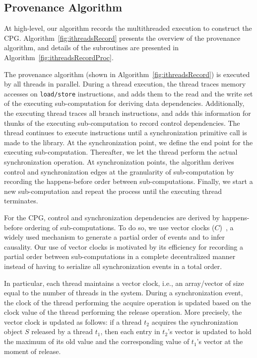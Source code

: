  
 
 \subsection{ Provenance Algorithm}
 \label{subsec:prov-algo}

 
 
At high-level, our algorithm records the multithreaded execution to construct the CPG. Algorithm~\ref{fig:ithreadsRecord} presents the overview of the provenance algorithm, and details of the subroutines are presented in Algorithm~\ref{fig:ithreadsRecordProc}.
  


   The provenance algorithm (shown in Algorithm~\ref{fig:ithreadsRecord}) is executed by all threads in parallel. During a thread execution, the thread traces memory accesses on {\tt load/store} instructions, and adds them to the read and
the write set of the executing sub-computation for deriving data dependencies. Additionally, the executing thread traces all branch instructions, and adds this information for thunks of the executing sub-computation to record control dependencies.
The thread continues to execute instructions until a synchronization primitive call is made to the \pthreads  library. At the synchronization point, we define the end point for the executing sub-computation. 
Thereafter, we let the thread perform the actual synchronization operation. At synchronization points, the algorithm derives control  and synchronization edges at the granularity of sub-computation by recording the happens-before order between sub-computations. Finally, we start a new sub-computation and repeat the process until the executing thread
terminates. 

 

 For the CPG, control and synchronization dependencies are derived by 
happens-before ordering of sub-computations. To do so, we use vector clocks
($C$)~\cite{Mattern89virtualtime},  a widely used mechanism to generate a partial order of events and to infer causality. Our use of vector
clocks is motivated by its efficiency for recording a partial order between sub-computations in a complete decentralized manner instead of having to serialize all synchronization events in a total order.

In particular, each thread maintains a vector clock, i.e., an array/vector of size equal to the number of threads in the system.  
During a synchronization event, the clock of the thread performing the
acquire operation is updated based on the clock value of the thread performing
the release operation.  More precisely, the vector clock is updated as follows: if a thread $t_2$ acquires the synchronization
object $S$ released by a thread $t_1$, then each entry in $t_2$'s vector is
updated to hold the maximum of its old value and the corresponding value of
$t_1$'s vector at the moment of release.



